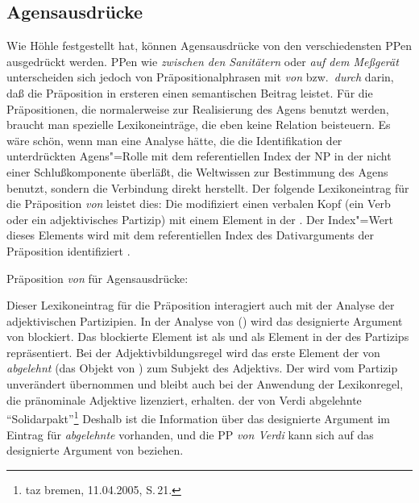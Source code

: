 {


\subsection{Agensausdrücke}
\label{sec-analyse-agensausdruecke}

Wie Höhle festgestellt hat, können Agensausdrücke von den verschiedensten PPen
ausgedrückt werden. PPen wie \emph{zwischen den Sanitätern} oder \emph{auf dem Meßgerät}
unterscheiden sich jedoch von Präpositionalphrasen mit \emph{von} bzw.\ \emph{durch} darin,
daß die Präposition in ersteren einen semantischen Beitrag leistet. Für die Präpositionen,
die normalerweise zur Realisierung des Agens benutzt werden, braucht man spezielle
Lexikoneinträge, die eben keine Relation beisteuern. Es wäre schön, wenn man eine Analyse hätte,
die die Identifikation der unterdrückten Agens"=Rolle mit dem referentiellen Index der NP in
der \vonpp nicht einer Schlußkomponente überläßt, die Weltwissen zur Bestimmung des Agens benutzt,
sondern die Verbindung direkt herstellt.
Der folgende Lexikoneintrag für die Präposition \emph{von} leistet dies:
Die \vonpp modifiziert einen verbalen Kopf (ein Verb oder ein adjektivisches Partizip) mit
einem Element in der \dalist. Der Index"=Wert dieses Elements wird mit dem referentiellen
Index des Dativarguments der Präposition identifiziert .

\eas
Präposition \emph{von} für Agensausdrücke:\\
\zs

\noindent
Dieser Lexikoneintrag für die Präposition interagiert auch mit der Analyse der adjektivischen Partizipien.
In der Analyse von () wird das designierte Argument von  blockiert. Das blockierte
Element ist als \subjw und als Element in der \dalist des Partizips repräsentiert. Bei der Adjektivbildungsregel
wird das erste Element der \subcatl von \emph{abgelehnt} (das Objekt von ) zum Subjekt
des Adjektivs. Der \daw wird vom Partizip unverändert übernommen und bleibt auch bei der Anwendung
der Lexikonregel, die pränominale Adjektive lizenziert, erhalten.
\ea
der von Verdi abgelehnte "`Solidarpakt"'\footnote{
  taz bremen, 11.04.2005, S.\,21.%
}
\z
Deshalb ist die Information über das designierte Argument im Eintrag für \emph{abgelehnte} vorhanden,
und die PP \emph{von Verdi} kann sich auf das designierte Argument von  beziehen.

}
